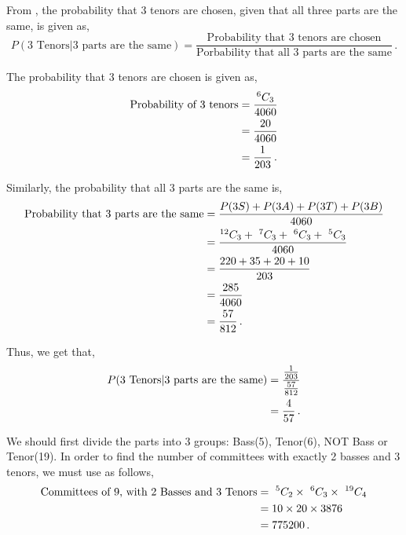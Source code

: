 \begin{subquestions}
\begin{subsubquestions}
\begin{subsubsubquestions}
\subsubsubquestion

From , the probability that 3 tenors are chosen, given that all three parts are the same, is given as,
\begin{equation}
	P(\text{3 Tenors|3 parts are the same}) = \frac{\text{Probability that 3 tenors are chosen}}{\text{Porbability that all 3 parts are the same}} \,.
\end{equation}

The probability that 3 tenors are chosen is given as,
\begin{align}
	\text{Probability of 3 tenors} & = \frac{^{6}C_3}{4060} \nonumber \\
	                               & = \frac{20}{4060} \nonumber \\
	                               & = \frac{1}{203} \,.
\end{align}

Similarly, the probability that all 3 parts are the same is,
\begin{align}
	\text{Probability that 3 parts are the same} & = \frac{P(3S) + P(3A) + P(3T) + P(3B)}{4060} \nonumber \\
												& = \frac{^{12}C_3 + ~^{7}C_3 + ~^{6}C_3 + ~^{5}C_3}{4060} \nonumber \\
												& = \frac{220+35+20+10}{203} \nonumber \\
												& = \frac{285}{4060} \nonumber \\
												& = \frac{57}{812} \,.
\end{align}

Thus, we get that,
\begin{align}
	P(\text{3 Tenors|3 parts are the same}) & = \frac{\frac{1}{203}}{\frac{57}{812}} \nonumber \\
	                                        & = \frac{4}{57} \,.
\end{align}

\end{subsubsubquestions}


\subsubquestion

We should first divide the parts into 3 groups: Bass(5), Tenor(6), NOT Bass or Tenor(19). In order to find the number of committees with exactly 2 basses and 3 tenors, we must use  as follows,
\begin{align}
	\text{Committees of 9, with 2 Basses and 3 Tenors} & = ~^5C_2 \times ~^6C_3 \times ~^{19}C_4 \nonumber \\
	                                                   & = 10 \times 20 \times 3876 \nonumber \\
	                                                   & = 775200 \,.
\end{align}


\end{subsubquestions}
\end{subquestions}
